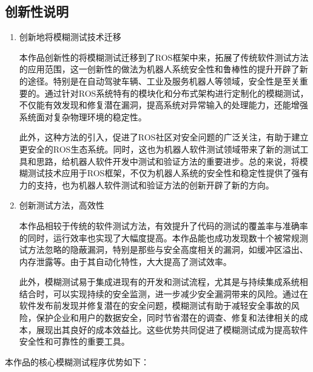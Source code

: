 \subsection{创新性说明}
\begin{enumerate}
  \item 创新地将模糊测试技术迁移
  
  本作品创新性的将模糊测试迁移到了ROS框架中来，拓展了传统软件测试方法的应用范围，这一创新性的做法为机器人系统安全性和鲁棒性的提升开辟了新的途径。特别是在自动驾驶车辆、工业及服务机器人等领域，安全性是至关重要的。通过针对ROS系统特有的模块化和分布式架构进行定制化的模糊测试，不仅能有效发现和修复潜在漏洞，提高系统对异常输入的处理能力，还能增强系统面对复杂物理环境的稳定性。
  
  此外，这种方法的引入，促进了ROS社区对安全问题的广泛关注，有助于建立更安全的ROS生态系统。同时，这也为机器人软件测试领域带来了新的测试工具和思路，给机器人软件开发中测试和验证方法的重要进步。总的来说，将模糊测试技术应用于ROS框架，不仅为机器人系统的安全性和稳定性提供了强有力的支持，也为机器人软件测试和验证方法的创新开辟了新的方向。
  
  \item 创新测试方法，高效性
  
  本作品相较于传统的软件测试方法，有效提升了代码的测试的覆盖率与准确率的同时，运行效率也实现了大幅度提高。本作品能也成功发现数十个被常规测试方法忽略的隐蔽漏洞，特别是那些与安全高度相关的漏洞，如缓冲区溢出、内存泄露等。由于其自动化特性，大大提高了测试效率。
  
  此外，模糊测试易于集成进现有的开发和测试流程，尤其是与持续集成系统相结合时，可以实现持续的安全监测，进一步减少安全漏洞带来的风险。通过在软件发布前发现并修复潜在的安全问题，模糊测试有助于减轻安全事故的风险，保护企业和用户的数据安全，同时节省潜在的调查、修复和法律相关的成本，展现出其良好的成本效益比。这些优势共同促进了模糊测试成为提高软件安全性和可靠性的重要工具。
    
\end{enumerate}

本作品的核心模糊测试程序优势如下：


